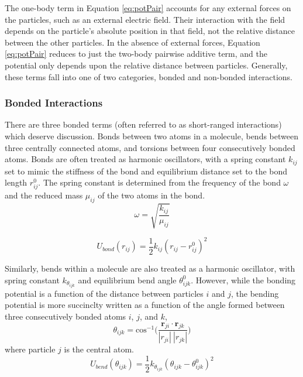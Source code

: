 The one-body term in Equation \eqref{eq:potPair} accounts for any
external forces on the particles, such as an external electric
field. Their interaction with the field depends on the particle's
absolute position in that field, not the relative distance between the
other particles. In the absence of external forces, Equation
\eqref{eq:potPair} reduces to just the two-body pairwise additive
term, and the potential only depends upon the relative distance
between particles. Generally, these terms fall into one of two
categories, bonded and non-bonded interactions.

\subsubsection{Bonded Interactions}
There are three bonded terms (often referred to as short-ranged
interactions) which deserve discussion. Bonds between two atoms in a
molecule, bends between three centrally connected atoms, and torsions
between four consecutively bonded atoms. Bonds are often treated as
harmonic oscillators, with a spring constant $k_{ij}$ set to mimic the
stiffness of the bond and equilibrium distance set to the bond length
$r_{ij}^0$. The spring constant is determined from the frequency of
the bond $\omega$ and the reduced mass $\mu_{ij}$ of the two atoms in the
bond.
\begin{equation}\label{eq:kij}
\omega = \sqrt{\frac{k_{ij}}{\mu_{ij}} }
\end{equation}

\begin{equation}\label{eq:bonds}
U_{bond}(r_{ij}) = \frac{1}{2} k_{ij} (r_{ij} -r_{ij}^0)^2
\end{equation}

Similarly, bends within a molecule are also treated as a harmonic
oscillator, with spring constant $k_{\theta_{ijk}}$ and equilibrium bend
angle $\theta_{ijk}^0$. However, while the bonding potential is a
function of the distance between particles $i$ and $j$, the bending
potential is more succinclty written as a function of the angle formed between three
consecutively bonded atoms $i$, $j$, and $k$,
\begin{equation}\label{eq:bend}
\theta_{ijk} = \mathrm{cos}^{-1}\Bigg(\frac{\mathbf{r}_{ji} \cdot
  \mathbf{r}_{jk}}{|r_{ji}|~|r_{jk}|}\Bigg)
\end{equation}
where particle $j$ is the central atom. 
\begin{equation}\label{eq:bend2}
U_{bend}(\theta_{ijk}) = \frac{1}{2} k_{\theta_{ijk}} (\theta_{ijk} -
\theta_{ijk}^0)^2
\end{equation}

